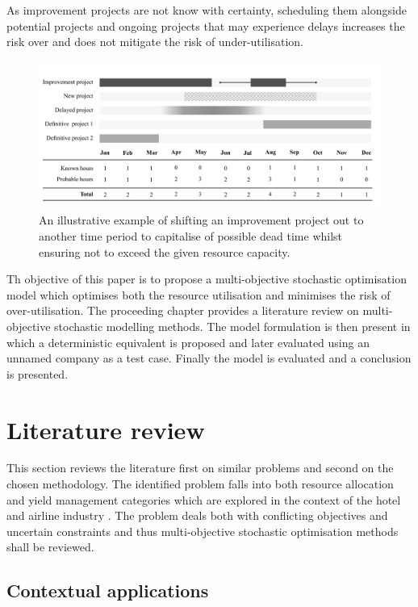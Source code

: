 \documentclass[a4paper,11pt]{article}
\begin{document}
As improvement projects are not know with certainty, scheduling them alongside potential projects and ongoing projects that may experience delays increases the risk over and does not mitigate the risk of under-utilisation. 


\begin{figure}[]
\label{fig:1}
\includegraphics[width=15cm]{../Images/slice1.pdf}
\caption{An illustrative example of shifting an improvement project out to another time period to capitalise of possible dead time whilst ensuring not to exceed the given resource capacity.}
\end{figure}

Th objective of this paper is to propose a multi-objective stochastic optimisation model which optimises both the resource utilisation and minimises the risk of over-utilisation. The proceeding chapter provides a literature review on multi-objective stochastic modelling methods. The model formulation is then present in which a deterministic equivalent is proposed and later evaluated using an unnamed company as a test case. Finally the model is evaluated and a conclusion is presented.


\section{Literature review}
This section reviews the literature first on similar problems and second on the chosen methodology. The identified problem falls into both resource allocation and yield management categories which are explored in the context of the hotel and airline industry \citep{cleophas2017resilient}. The problem deals both with conflicting objectives and uncertain constraints and thus multi-objective stochastic optimisation methods shall be reviewed.

\subsection{Contextual applications}
\end{document}
